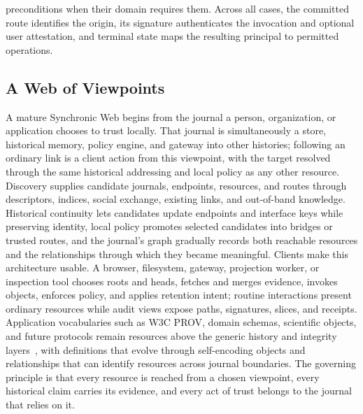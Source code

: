 preconditions when their domain requires them. Across all cases, the committed route identifies the origin, its signature authenticates the invocation and optional user attestation, and terminal state maps the resulting principal to permitted operations.

\subsection{A Web of Viewpoints}

A mature Synchronic Web begins from the journal a person, organization, or application chooses to trust locally. That journal is simultaneously a store, historical memory, policy engine, and gateway into other histories; following an ordinary link is a client action from this viewpoint, with the target resolved through the same historical addressing and local policy as any other resource. Discovery supplies candidate journals, endpoints, resources, and routes through descriptors, indices, social exchange, existing links, and out-of-band knowledge. Historical continuity lets candidates update endpoints and interface keys while preserving identity, local policy promotes selected candidates into bridges or trusted routes, and the journal's graph gradually records both reachable resources and the relationships through which they became meaningful. Clients make this architecture usable. A browser, filesystem, gateway, projection worker, or inspection tool chooses roots and heads, fetches and merges evidence, invokes objects, enforces policy, and applies retention intent; routine interactions present ordinary resources while audit views expose paths, signatures, slices, and receipts. Application vocabularies such as W3C PROV, domain schemas, scientific objects, and future protocols remain resources above the generic history and integrity layers~\cite{Moreau2010open,Moreau2013prov}, with definitions that evolve through self-encoding objects and relationships that can identify resources across journal boundaries. The governing principle is that every resource is reached from a chosen viewpoint, every historical claim carries its evidence, and every act of trust belongs to the journal that relies on it.